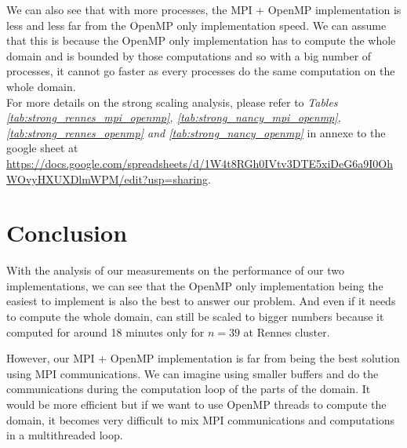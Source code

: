 \documentclass[12pt]{article}
\begin{document}
We can also see that with more processes, the MPI + OpenMP implementation is less
and less far from the OpenMP only implementation speed. We can assume that this
is because the OpenMP only implementation has to compute the whole domain and
is bounded by those computations and so with a big number of processes, it cannot
go faster as every processes do the same computation on the whole domain. \\

For more details on the strong scaling analysis, please refer to \textit{Tables \ref{tab:strong_rennes_mpi_openmp},
    \ref{tab:strong_nancy_mpi_openmp}, \ref{tab:strong_rennes_openmp} and \ref{tab:strong_nancy_openmp}} in
annexe to the google sheet at
\url{https://docs.google.com/spreadsheets/d/1W4t8RGh0IVtv3DTE5xiDeG6a9I0OhWOvyHXUXDlmWPM/edit?usp=sharing}.

\section{Conclusion}

With the analysis of our measurements on the performance of our two implementations,
we can see that the OpenMP only implementation being the easiest to implement
is also the best to answer our problem. And even if it needs to compute the whole
domain, can still be scaled to bigger numbers because it computed for around 18
minutes only for \(n = 39\) at Rennes cluster.

However, our MPI + OpenMP implementation is far from being the best solution using
MPI communications. We can imagine using smaller buffers and do the communications
during the computation loop of the parts of the domain. It would be more efficient
but if we want to use OpenMP threads to compute the domain, it becomes very
difficult to mix MPI communications and computations in a multithreaded loop.


\end{document}
